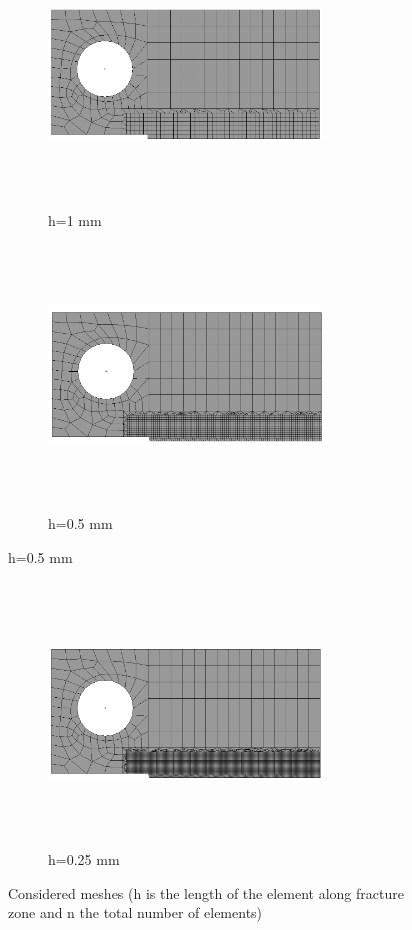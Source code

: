 \documentclass[12pt]{report}
\begin{document}
\begin{figure}[htbp!]
      \begin{subfigure}{0.35\textwidth}
          \includegraphics[width=7.25cm,height=7cm,keepaspectratio]{26.h=1mm.png}
         \caption{h=1 mm}
         \label{fig:1mm}
     \end{subfigure}
    \hspace{3cm}
     \begin{subfigure}{0.35\textwidth}
         \includegraphics[width=7.3cm,height=7cm,keepaspectratio]{26.h=0.5mm.png}
         \caption{h=0.5 mm}
         \label{fig:0.5mm}
     \end{subfigure}
\end{figure}
\FloatBarrier
\begin{figure}[htbp!]\ContinuedFloat
     \centering
     \begin{subfigure}{0.35\textwidth}
         \includegraphics[width=7.3cm,height=7cm,keepaspectratio]{26.h=0.25mm.png}
         \caption{h=0.25 mm}
         \label{fig:0.25mm}
     \end{subfigure}
    \caption{Considered meshes (h is the length of the element along fracture zone and n the total number of elements) }
    \label{fig:Considered meshes 2}
\end{figure}
\end{document}
